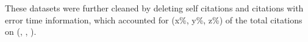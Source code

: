 These datasets were further cleaned by deleting self citations and citations with error time information, which accounted for (x\%, y\%, z\%) of the total citations on (\aan, \aminer, \magdata).









